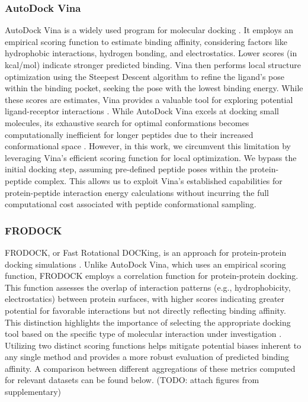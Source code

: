 \subsubsection{AutoDock Vina}
AutoDock Vina is a widely used program for molecular docking \cite{trott2010autodock}. It employs an empirical scoring function to estimate binding affinity, considering factors like hydrophobic interactions, hydrogen bonding, and electrostatics. Lower scores (in kcal/mol) indicate stronger predicted binding. Vina then performs local structure optimization using the Steepest Descent algorithm to refine the ligand's pose within the binding pocket, seeking the pose with the lowest binding energy. While these scores are estimates, Vina provides a valuable tool for exploring potential ligand-receptor interactions \cite{trott2010autodock}. While AutoDock Vina excels at docking small molecules, its exhaustive search for optimal conformations becomes computationally inefficient for longer peptides due to their increased conformational space \cite{rentzsch2015docking}. However, in this work, we circumvent this limitation by leveraging Vina's efficient scoring function for local optimization. We bypass the initial docking step, assuming pre-defined peptide poses within the protein-peptide complex. This allows us to exploit Vina's established capabilities for protein-peptide interaction energy calculations without incurring the full computational cost associated with peptide conformational sampling.

\subsubsection{FRODOCK}
FRODOCK, or Fast Rotational DOCKing, is an approach for protein-protein docking simulations \cite{Aportela2016}. Unlike AutoDock Vina, which uses an empirical scoring function, FRODOCK employs a correlation function for protein-protein docking. This function assesses the overlap of interaction patterns (e.g., hydrophobicity, electrostatics) between protein surfaces, with higher scores indicating greater potential for favorable interactions but not directly reflecting binding affinity. This distinction highlights the importance of selecting the appropriate docking tool based on the specific type of molecular interaction under investigation \cite{Aportela2016}.  \\

Utilizing two distinct scoring functions helps mitigate potential biases inherent to any single method and provides a more robust evaluation of predicted binding affinity. 
A comparison between different aggregations of these metrics computed for relevant datasets can be found below. (TODO: attach figures from supplementary)

